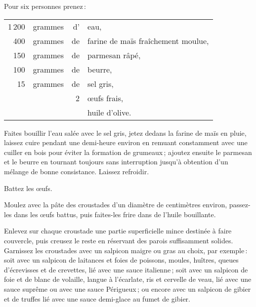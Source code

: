 Pour six personnes prenez :

\footnotesize
\begin{longtable}{rrrp{16em}}
  1 200 & grammes & d' & eau,                                                                             \\
    400 & grammes & de & farine de maïs fraîchement moulue,                                               \\
    150 & grammes & de & parmesan râpé,                                                                   \\
    100 & grammes & de & beurre,                                                                          \\
     15 & grammes & de & sel gris,                                                                        \\
        &         &  2 & œufs frais,                                                                      \\
        &         &    & huile d'olive.                                                                   \\
\end{longtable}
\normalsize

Faites bouillir l'eau salée avec le sel gris, jetez dedans la farine de maïs en
pluie, laissez cuire pendant une demi-heure environ en remuant constamment avec
une cuiller en bois pour éviter la formation de grumeaux ; ajoutez ensuite le
parmesan et le beurre en tournant toujours sans interruption jusqu'à obtention
d'un mélange de bonne consistance. Laissez refroidir.

Battez les œufs.

Moulez avec la pâte des croustades d'un diamètre de {\mmm} centimètres
environ, passez-les dans les œufs battus, puis faites-les frire dans de l'huile
bouillante.

Enlevez sur chaque croustade une partie superficielle mince destinée à faire
couvercle, puis creusez le reste en réservant des parois suffisamment solides.
Garnissez les croustades avec un salpicon maigre ou gras au choix, par
exemple : soit avec un salpicon de laitances et foies de poissons, moules,
huîtres, queues d'écrevisses et de crevettes, lié avec une sauce italienne ;
soit avec un salpicon de foie et de blanc de volaille, langue à l'écarlate, ris
et cervelle de veau, lié avec une sauce suprême ou avec une sauce Périgueux ;
ou encore avec un salpicon de gibier et de truffes lié avec une sauce
demi-glace au fumet de gibier.

